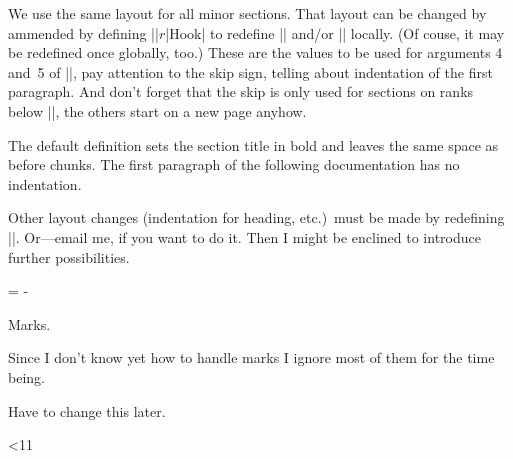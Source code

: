 \documentclass{progltx}
\begin{document}
    \fi
   \fi
  \or
    \def\CwebSection#1#2{%
	\def\cwbb@sect_name{chunk}%
	\cwbb@section{#1}{\protect\cwbbRank{#1}#2}%
	}
    \def\section{%
	\def\cwbb@sect_name{chunk}%
	\cwbb@section{1}%
	}
\fi
\endprog


\sect We use the same layout for all minor sections. That layout can
be changed by ammended by defining |\CwebSect|$r$|Hook| to redefine
|\CwebSectPreSkip| and/or |\CwebSectLayout| locally. (Of couse, it may
be redefined once globally, too.) These are the values to be used for
arguments 4 and~5 of |\@startsection|, pay attention to the skip sign,
telling about indentation of the first paragraph. And don't forget
that the skip is only used for sections on ranks below
|\CwebRankNoEject|, the others start on a new page anyhow.

The default definition sets the section title in bold and leaves the
same space as before chunks. The first paragraph of the following
documentation has no indentation.

Other layout changes (indentation for heading, etc.)\ must be made by
redefining |\cwbb@section|. Or---email me, if you want to do it. Then
I might be enclined to introduce further possibilities.

\beginprog
\newskip\CwebSectPreSkip
	\CwebSectPreSkip = -\CwebChunkPreSkip
\def\CwebSectLayout{\normalfont\bfseries}

\def\cwbb@section#1{%
    \csname CwebSect#1Hook\endcsname	%
    \expandafter\@startsection
	\expandafter{\cwbb@sect_name}%
	{#1}%
	\z@				%
	\CwebSectPreSkip		%
	\medskipamount			%
        \CwebSectLayout
    }
\endprog




\chap Marks.

\begin{fixme}
  Since I don't know yet how to handle marks I ignore most of them for
  the time being.

  Have to change this later.
\end{fixme}

\beginprog
\let\chunkmark\@gobble

\@whilenum \count@<11 \do {
    \expandafter\let \csname section\number\count@ mark\endcsname \@gobble
    \advance \count@ by 1
    }
\endprog
\end{document}
